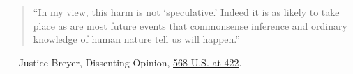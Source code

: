\documentclass[12pt]{article}
\begin{document}
\begin{quote}
``In my view, this harm is not `speculative.' Indeed it is as likely to take place as are most future events that commonsense inference and ordinary knowledge of human nature tell us will happen.''
\end{quote}
\noindent--- Justice Breyer, Dissenting Opinion, \href{https://supreme.justia.com/cases/federal/us/568/398/}{568 U.S. at 422}.
\end{document}
